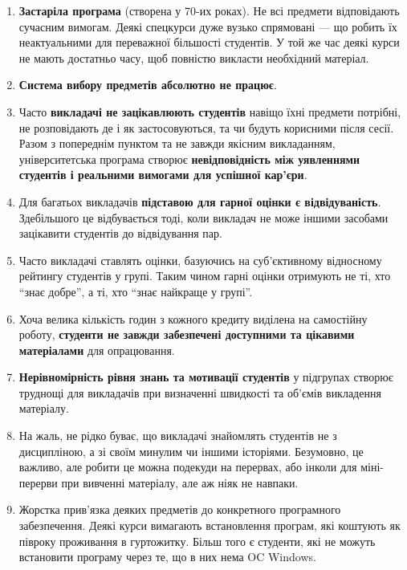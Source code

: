 \documentclass[14pt, a4paper]{extarticle}  %
\begin{document}
\begin{enumerate}
    \item \textbf{Застаріла програма} (створена у 70-их роках). Не всі предмети відповідають сучасним вимогам. Деякі спецкурси дуже вузько спрямовані --- що робить їх неактуальними для переважної більшості студентів. У той же час деякі курси не мають достатньо часу, щоб повністю викласти необхідний матеріал. 
  
    \item \textbf{Система вибору предметів абсолютно не працює}.
    
    \item  Часто \textbf{викладачі не зацікавлюють студентів} навіщо їхні предмети потрібні, не розповідають де і як застосовуються, та чи  будуть корисними після сесії. Разом з попереднім пунктом та не завжди якісним викладанням, університетська програма створює \textbf{невідповідність між уявленнями студентів і реальними вимогами для успішної кар'єри}.
    
    \item  Для багатьох викладачів \textbf{підставою для гарної оцінки є відвідуваність}. Здебільшого це відбувається тоді, коли викладач не може іншими засобами зацікавити студентів до відвідування пар. 
    
    \item Часто викладачі ставлять оцінки, базуючись на суб'єктивному відносному рейтингу студентів у групі. Таким чином гарні оцінки отримують не ті, хто ``знає добре'', а ті, хто ``знає найкраще у групі''.
    
    \item Хоча велика кількість годин з кожного кредиту виділена на самостійну роботу, \textbf{студенти не завжди забезпечені доступними та цікавими матеріалами} для опрацювання. 
    
    \item \textbf{Нерівномірність рівня знань та мотивації студентів} у підгрупах створює труднощі для викладачів при визначенні швидкості та об'ємів викладення матеріалу. 
    
    \item На жаль, не рідко буває, що викладачі знайомлять студентів не з дисципліною, а зі своїм минулим чи іншими історіями. Безумовно, це важливо, але робити це можна подекуди на перервах, або інколи для міні-перерви при вивченні матеріалу, але аж ніяк не навпаки.
    
    \item Жорстка прив'язка деяких предметів до конкретного програмного забезпечення. Деякі курси вимагають встановлення програм, які коштують як півроку проживання в гуртожитку. Більш того є студенти, які не можуть встановити програму через те, що в них нема OC Windows.
\end{enumerate}
\newpage
\end{document}
